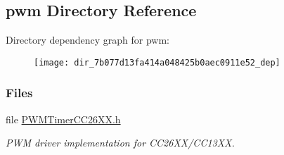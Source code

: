 \subsection{pwm Directory Reference}
\label{dir_7b077d13fa414a048425b0aec0911e52}
Directory dependency graph for pwm\+:
\nopagebreak
\begin{figure}[H]
\begin{center}
\leavevmode
\texttt{[image: dir\_7b077d13fa414a048425b0aec0911e52\_dep]}
\end{center}
\end{figure}
\subsubsection*{Files}
\begin{DoxyCompactItemize}
\item 
file \hyperlink{_p_w_m_timer_c_c26_x_x_8h}{P\+W\+M\+Timer\+C\+C26\+X\+X.\+h}
\begin{DoxyCompactList}\small\item\em P\+W\+M driver implementation for C\+C26\+X\+X/\+C\+C13\+X\+X. \end{DoxyCompactList}\end{DoxyCompactItemize}
